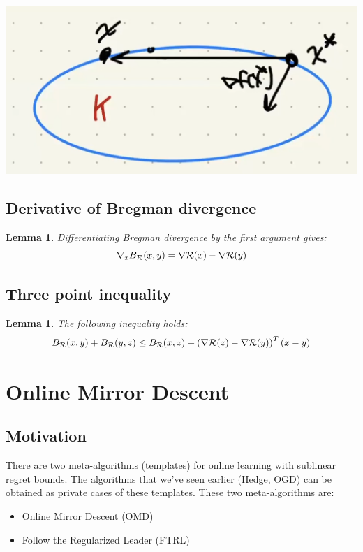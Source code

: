 \documentclass[11pt]{article}
\newtheorem{lemma}[theorem]{Lemma}
\theoremstyle{definition}
\theoremstyle{definition}
\newcommand{\pth}[1]{\left( #1\right)}                 %
\begin{document}
\includegraphics[scale=0.5]{convex_optimality}


\subsection{Derivative of Bregman divergence}

\begin{lemma}
Differentiating Bregman divergence by the first argument gives:
\begin{equation*}
\nabla_x B_{\mathcal R} (x,y) = \nabla \mathcal R(x) - \nabla \mathcal R(y)
\end{equation*}

\end{lemma}

\subsection{Three point inequality}

\begin{lemma}
The following inequality holds:
\begin{equation*}
B_\R (x,y) + B_\R (y,z) \leq B_\R (x,z) + \pth{\nabla \R(z) - \nabla \R(y)}^T \pth{x-y}
\end{equation*}

\end{lemma}


\section{Online Mirror Descent}

\subsection{Motivation}

There are two meta-algorithms (templates) for online learning with sublinear regret bounds. The algorithms that we've seen earlier (Hedge, OGD) can be obtained as private cases of these templates. These two meta-algorithms are:
\begin{itemize}
\item Online Mirror Descent (OMD)
\item Follow the Regularized Leader (FTRL)
\end{itemize}
\end{document}
